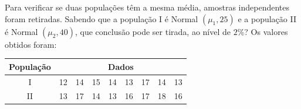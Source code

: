 %
%


\begin{exercicioBanco}[\valorquestao]
    Para verificar se duas populações têm a mesma média, amostras independentes foram retiradas. Sabendo que a população I é Normal \((\mu_1,25)\) e a população II é Normal \((\mu_2,40)\), que conclusão pode ser tirada, ao nível de \(2\%\)? Os valores obtidos foram:

    \begin{center}
    \begin{tabular}{|c|cccccccc|}
        \hline
        \textbf{População} & \multicolumn{8}{c|}{\textbf{Dados}} \\
        \hline
        I  & 12 & 14 & 15 & 14 & 13 & 17 & 14 & 13 \\
        II & 13 & 17 & 14 & 13 & 16 & 17 & 18 & 16 \\
        \hline
    \end{tabular}
    \end{center}
\end{exercicioBanco}

